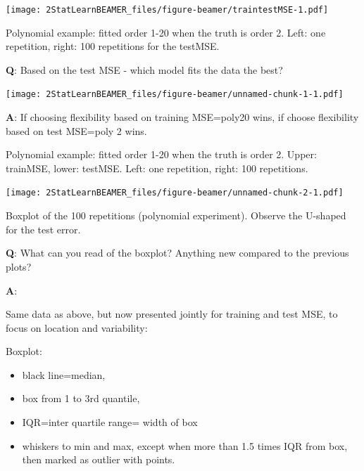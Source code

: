 \documentclass[ignorenonframetext,]{beamer}
\providecommand{\tightlist}{%
  \setlength{\itemsep}{0pt}\setlength{\parskip}{0pt}}
\begin{document}
\begin{frame}

\texttt{[image: 2StatLearnBEAMER\_files/figure-beamer/traintestMSE-1.pdf]}

Polynomial example: fitted order 1-20 when the truth is order 2. Left:
one repetition, right: 100 repetitions for the testMSE.

\textbf{Q}: Based on the test MSE - which model fits the data the best?

\end{frame}

\begin{frame}

\texttt{[image: 2StatLearnBEAMER\_files/figure-beamer/unnamed-chunk-1-1.pdf]}

\textbf{A}: If choosing flexibility based on training MSE=poly20 wins,
if choose flexibility based on test MSE=poly 2 wins.

Polynomial example: fitted order 1-20 when the truth is order 2. Upper:
trainMSE, lower: testMSE. Left: one repetition, right: 100 repetitions.

\end{frame}

\begin{frame}

\texttt{[image: 2StatLearnBEAMER\_files/figure-beamer/unnamed-chunk-2-1.pdf]}

Boxplot of the 100 repetitions (polynomial experiment). Observe the
U-shaped for the test error.

\textbf{Q}: What can you read of the boxplot? Anything new compared to
the previous plots?

\end{frame}

\begin{frame}

\textbf{A}:

Same data as above, but now presented jointly for training and test MSE,
to focus on location and variability:

Boxplot:

\begin{itemize}
\tightlist
\item
  black line=median,
\item
  box from 1 to 3rd quantile,
\item
  IQR=inter quartile range= width of box
\item
  whiskers to min and max, except when more than 1.5 times IQR from box,
  then marked as outlier with points.
\end{itemize}

\end{frame}
\end{document}
